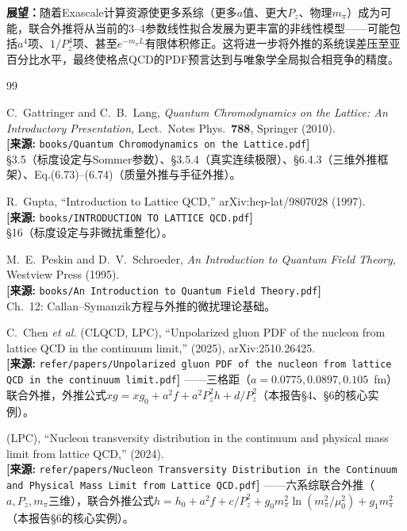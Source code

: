 \documentclass[12pt,a4paper]{ctexart}
\theoremstyle{definition}
\begin{document}
\textbf{展望：}随着Exascale计算资源使更多系综（更多$a$值、更大$P_z$、物理$m_\pi$）成为可能，联合外推将从当前的3--4参数线性拟合发展为更丰富的非线性模型——可能包括$a^4$项、$1/P_z^4$项、甚至$e^{-m_\pi L}$有限体积修正。这将进一步将外推的系统误差压至亚百分比水平，最终使格点QCD的PDF预言达到与唯象学全局拟合相竞争的精度。

\begin{thebibliography}{99}

C.~Gattringer and C.~B.~Lang,
\textit{Quantum Chromodynamics on the Lattice: An Introductory Presentation},
Lect.\ Notes Phys.\ \textbf{788}, Springer (2010).
\\\textbf{[来源:} \texttt{books/Quantum Chromodynamics on the Lattice.pdf}\textbf{]}
\\§3.5（标度设定与Sommer参数）、§3.5.4（真实连续极限）、§6.4.3（三维外推框架）、Eq.(6.73)--(6.74)（质量外推与手征外推）。

R.~Gupta,
``Introduction to Lattice QCD,''
arXiv:hep-lat/9807028 (1997).
\\\textbf{[来源:} \texttt{books/INTRODUCTION TO LATTICE QCD.pdf}\textbf{]}
\\§16（标度设定与非微扰重整化）。

M.~E.~Peskin and D.~V.~Schroeder,
\textit{An Introduction to Quantum Field Theory},
Westview Press (1995).
\\\textbf{[来源:} \texttt{books/An Introduction to Quantum Field Theory.pdf}\textbf{]}
\\Ch.~12: Callan--Symanzik方程与外推的微扰理论基础。

C.~Chen \textit{et al.} (CLQCD, LPC),
``Unpolarized gluon PDF of the nucleon from lattice QCD in the continuum limit,''
(2025), arXiv:2510.26425.
\\\textbf{[来源:} \texttt{refer/papers/Unpolarized gluon PDF of the nucleon from lattice QCD in the continuum limit.pdf}\textbf{]}
——三格距（$a = 0.0775, 0.0897, 0.105$~fm）联合外推，外推公式$xg = xg_0 + a^2 f + a^2 P_z^2 h + d/P_z^2$（本报告§4、§6的核心实例）。

(LPC),
``Nucleon transversity distribution in the continuum and physical mass limit from lattice QCD,''
(2024).
\\\textbf{[来源:} \texttt{refer/papers/Nucleon Transversity Distribution in the Continuum and Physical Mass Limit from Lattice QCD.pdf}\textbf{]}
——六系综联合外推（$a, P_z, m_\pi$三维），联合外推公式$h = h_0 + a^2 f + c/P_z^2 + g_0 m_\pi^2\ln(m_\pi^2/\mu_0^2) + g_1 m_\pi^2$（本报告§6的核心实例）。


\end{thebibliography}
\end{document}
